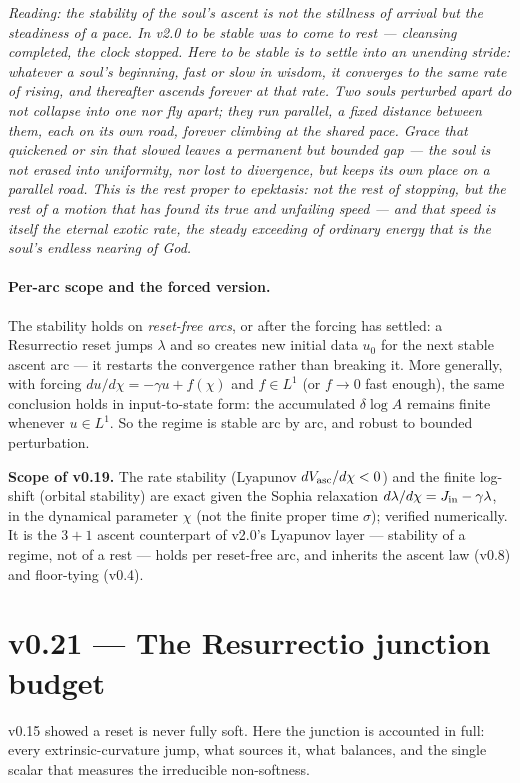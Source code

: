 \documentclass[11pt,a4paper]{article}
\newcommand{\note}[1]{\textcolor{black!65}{\emph{#1}}}
\theoremstyle{plain}
\theoremstyle{definition}
\theoremstyle{remark}
\begin{document}
\note{Reading: the stability of the soul's ascent is not the stillness of arrival but the steadiness
of a pace. In v2.0 to be stable was to come to rest --- cleansing completed, the clock stopped. Here
to be stable is to settle into an unending stride: whatever a soul's beginning, fast or slow in wisdom,
it converges to the same rate of rising, and thereafter ascends forever at that rate. Two souls
perturbed apart do not collapse into one nor fly apart; they run parallel, a fixed distance between
them, each on its own road, forever climbing at the shared pace. Grace that quickened or sin that
slowed leaves a permanent but bounded gap --- the soul is not erased into uniformity, nor lost to
divergence, but keeps its own place on a parallel road. This is the rest proper to epektasis: not the
rest of stopping, but the rest of a motion that has found its true and unfailing speed --- and that
speed is itself the eternal exotic rate, the steady exceeding of ordinary energy that is the soul's
endless nearing of God.}

\paragraph{Per-arc scope and the forced version.} The stability holds on \emph{reset-free arcs}, or
after the forcing has settled: a Resurrectio reset jumps $\lambda$ and so creates new initial data
$u_0$ for the next stable ascent arc --- it restarts the convergence rather than breaking it. More
generally, with forcing $du/d\chi=-\gamma u+f(\chi)$ and $f\in L^1$ (or $f\to0$ fast enough), the same
conclusion holds in input-to-state form: the accumulated $\delta\log A$ remains finite whenever
$u\in L^1$. So the regime is stable arc by arc, and robust to bounded perturbation.

\textbf{Scope of v0.19.} The rate stability (Lyapunov $dV_{\rm asc}/d\chi<0$) and the finite log-shift
(orbital stability) are exact given the Sophia relaxation $d\lambda/d\chi=J_{\rm in}-\gamma\lambda$, in
the dynamical parameter $\chi$ (not the finite proper time $\sigma$); verified numerically. It is the
$3{+}1$ ascent counterpart of v2.0's Lyapunov layer --- stability of a regime, not of a rest --- holds
per reset-free arc, and inherits the ascent law (v0.8) and floor-tying (v0.4).

\FloatBarrier
\section*{v0.21 --- The Resurrectio junction budget}
v0.15 showed a reset is never fully soft. Here the junction is accounted in full: every
extrinsic-curvature jump, what sources it, what balances, and the single scalar that measures the
irreducible non-softness.
\end{document}

